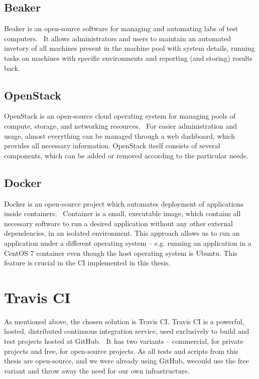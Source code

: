 \subsection{Beaker} \label{ref:beaker}
    Beaker is an open-source software for managing and automating labs of test
    computers.~\cite{beaker-docs} It allows administrators and users to maintain an
    automated invetory of all machines present in the machine pool with
    system details, running tasks on machines with specific environments and
    reporting (and storing) results back.

\subsection{OpenStack} \label{ref:openstack}
    OpenStack is an open-source cloud operating system for managing pools of compute, storage,
    and networking resources.~\cite{openstack-docs} For easier administration and
    usage, almost everything can be managed through a web dashboard, which provides
    all necessary information. OpenStack itself consists of several components,
    which can be added or removed according to the particular needs.

\subsection{Docker} \label{ref:docker}
    Docker is an open-source project which automates deployment of applications
    inside containers.~\cite{docker-docs} Container is a small, executable image,
    which contains all necessary software to run a desired application without
    any other external dependencies, in an isolated environment. This approach
    allows us to run an application under a different operating system -- e.g.
    running an application in a CentOS 7 container even though the host operating
    system is Ubuntu. This feature is crucial in the CI implemented in this thesis.

\section{Travis CI}
    As mentioned above, the chosen solution is Travis CI. Travis CI is a powerful,
    hosted, distributed continuous integration service, used exclusively to
    build and test projects hosted at GitHub.~\cite{travis-ci-docs} It has two
    variants -- commercial, for private projects and free, for open-source
    projects. As all tests and scripts from this thesis are open-source, and
    we were already using GitHub, wecould use the free variant and throw away
    the need for our own infrastructure.

